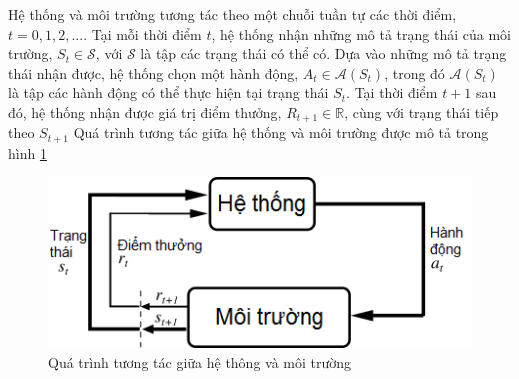 Hệ thống và môi trường tương tác theo một chuỗi tuần tự các thời điểm, $t = 0,1,2,...$. Tại mỗi thời điểm $t$, hệ thống nhận những mô tả trạng thái của môi trường, $\mathit{S_t} \in \mathcal{S}$, với $\mathcal{S}$ là tập các trạng thái có thể có. Dựa vào những mô tả trạng thái nhận được, hệ thống chọn một hành động, $\mathit{A_t} \in \mathcal{A}(\mathit{S_t})$, trong đó $\mathcal{A}(\mathit{S_t})$ là tập các hành động có thể thực hiện tại trạng thái $\mathit{S_t}$. Tại thời điểm $t+1$ sau đó, hệ thống nhận được giá trị điểm thưởng, $\mathit{R_{t+1}} \in \mathbb{R}$, cùng với trạng thái tiếp theo $\mathit{S_{t+1}}$ Quá trình tương tác giữa hệ thống và môi trường được mô tả trong hình \ref{AgentEnvironment}

\begin{figure}
	\centering
	\includegraphics[width=\textwidth]{AgentEnvironment}
	\caption{Quá trình tương tác giữa hệ thông và môi trường}
	\label{AgentEnvironment}
\end{figure}


